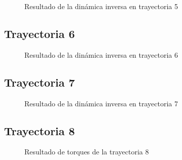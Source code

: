         \begin{figure}[h]
            \centering
            
            \caption{Resultado de la dinámica inversa en trayectoria 5}
            \label{f:cap7_tray5}
        \end{figure}

        \newpage

                
    \subsection{Trayectoria 6}
    
        \begin{figure}[h]
            \centering
            
            \caption{Resultado de la dinámica inversa en trayectoria 6}
            \label{f:cap7_tray6}
        \end{figure}
        

    \subsection{Trayectoria 7}
    
        \begin{figure}[h]
            \centering
            
            \caption{Resultado de la dinámica inversa en trayectoria 7}
            \label{f:cap7_tray7}
        \end{figure}


        \newpage
                
    \subsection{Trayectoria 8}
    
        \begin{figure}[h]
            \centering
            
            \caption{Resultado de torques de la trayectoria 8}
            \label{f:cap7_tray8}
        \end{figure}
        
        \newpage
        
\newpage
